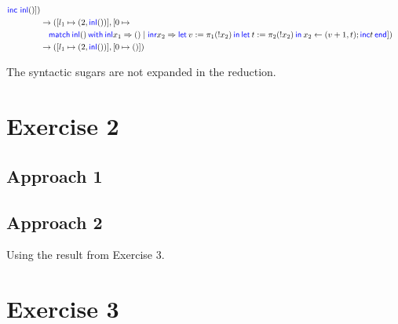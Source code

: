 \documentclass{article}
\begin{document}
\begin{align*}
    \langkw{inc} \ \Inl()])                                                                        \\
     & \cstepsto ([l_1 \mapsto (2, \Inl())], [0 \mapsto                                            \\ & \quad
    \Match{\Inl()}with{\Inl x_1}=>{()}|{\Inr x_2}=>{
    \Let{v}={\pi_1(!x_2)}in \Let{t}={\pi_2(!x_2)}in{x_2 \leftarrow (v+1, t); \langkw{inc} t}
    }end])                                                                                         \\
     & \cstepsto ([l_1 \mapsto (2, \Inl())], [0 \mapsto ()])                                       \\
\end{align*}

The syntactic sugars are not expanded in the reduction.

\section*{Exercise 2}

\subsection*{Approach 1}

\begin{prooftree}
\end{prooftree}

\subsection*{Approach 2}

Using the result from Exercise 3.

\begin{prooftree}
\end{prooftree}

\section*{Exercise 3}


\begin{prooftree}
\end{prooftree}
\end{document}

